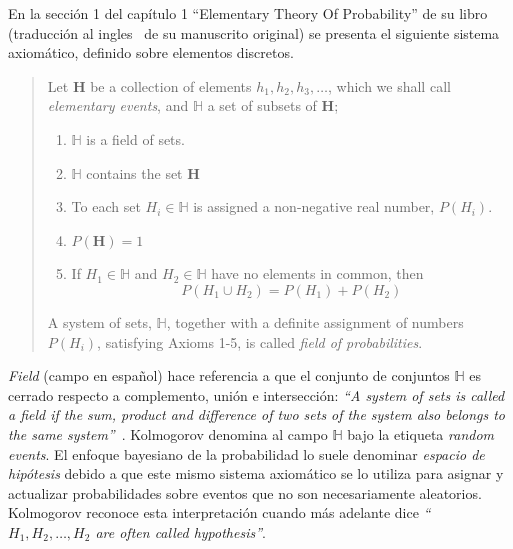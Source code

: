 \documentclass[a4paper,11pt]{book}
\theoremstyle{definition}
\begin{document}
En la secci\'on 1 del cap\'itulo 1 ``Elementary Theory Of Probability'' de su libro (traducci\'on al ingles~\cite{Kolmogorov1950} de su manuscrito original) se presenta el siguiente sistema axiom\'atico, definido sobre elementos discretos.
%
\begin{quotation}
Let $\textbf{H}$ be a collection of elements $h_1, h_2, h_3, \dots$,  which we shall call \emph{elementary events}, and $\mathbb{H}$ a set of subsets of $\textbf{H}$;
\begin{enumerate}\itemsep-0.05cm
  \item $\mathbb{H}$ is a field of sets.
  \item $\mathbb{H}$ contains the set $\textbf{H}$
  \item To each set $H_i \in \mathbb{H}$ is assigned a non-negative real number, $P(H_i)$. \label{item:Kol_3}
  \item $P(\textbf{H}) = 1$ \label{item:Kol_4}
  \item If $H_1 \in \mathbb{H}$ and $H_2 \in \mathbb{H}$ have no elements in common, then
\begin{equation}
  P(H_1 \cup H_2 ) = P(H_1) + P(H_2)
\end{equation} \label{item:Kol_5}
\end{enumerate}
A system of sets, $\mathbb{H}$, together with a definite assignment of numbers $P(H_i)$, satisfying Axioms 1-5, is called \emph{field of probabilities}.
%
%
%
\end{quotation}
%
\emph{Field} (campo en espa\~nol) hace referencia a que el conjunto de conjuntos $\mathbb{H}$ es cerrado respecto a complemento, uni\'on e intersecci\'on: \emph{``A system of sets is called a field if the sum, product and difference of two sets of the system also belongs to the same system''}~\cite{Kolmogorov1950}.
%
Kolmogorov denomina al campo $\mathbb{H}$ bajo la etiqueta \emph{random events}.
%
El enfoque bayesiano de la probabilidad lo suele denominar \emph{espacio de hip\'otesis} debido a que este mismo sistema axiom\'atico se lo utiliza para asignar y actualizar probabilidades sobre eventos que no son necesariamente aleatorios.
%
Kolmogorov reconoce esta interpretaci\'on cuando m\'as adelante dice \emph{``$H_1, H_2, \dots, H_2$ are often called hypothesis''}.
\end{document}
